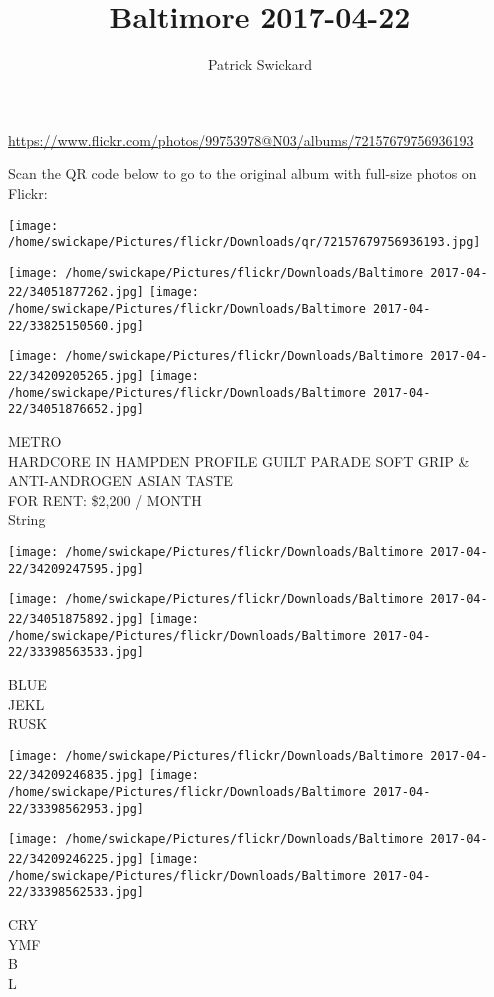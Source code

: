 \documentclass[10pt,letterpaper]{article}
\title{Baltimore 2017-04-22}
\author{Patrick Swickard}
\date{}
\begin{document}
\maketitle

\url{https://www.flickr.com/photos/99753978@N03/albums/72157679756936193}

Scan the QR code below to go to the original album with full-size photos on Flickr:

\texttt{[image: /home/swickape/Pictures/flickr/Downloads/qr/72157679756936193.jpg]}
\pagebreak

\texttt{[image: /home/swickape/Pictures/flickr/Downloads/Baltimore 2017-04-22/34051877262.jpg]}
\texttt{[image: /home/swickape/Pictures/flickr/Downloads/Baltimore 2017-04-22/33825150560.jpg]}

\texttt{[image: /home/swickape/Pictures/flickr/Downloads/Baltimore 2017-04-22/34209205265.jpg]}
\texttt{[image: /home/swickape/Pictures/flickr/Downloads/Baltimore 2017-04-22/34051876652.jpg]}

METRO\\
HARDCORE IN HAMPDEN PROFILE GUILT PARADE SOFT GRIP \& ANTI{-}ANDROGEN ASIAN TASTE\\
FOR RENT: \$2,200 / MONTH\\
String
\pagebreak

\texttt{[image: /home/swickape/Pictures/flickr/Downloads/Baltimore 2017-04-22/34209247595.jpg]}

\vspace{0.25in}
\texttt{[image: /home/swickape/Pictures/flickr/Downloads/Baltimore 2017-04-22/34051875892.jpg]}
\texttt{[image: /home/swickape/Pictures/flickr/Downloads/Baltimore 2017-04-22/33398563533.jpg]}

BLUE\\
JEKL\\
RUSK
\pagebreak

\texttt{[image: /home/swickape/Pictures/flickr/Downloads/Baltimore 2017-04-22/34209246835.jpg]}
\texttt{[image: /home/swickape/Pictures/flickr/Downloads/Baltimore 2017-04-22/33398562953.jpg]}

\texttt{[image: /home/swickape/Pictures/flickr/Downloads/Baltimore 2017-04-22/34209246225.jpg]}
\texttt{[image: /home/swickape/Pictures/flickr/Downloads/Baltimore 2017-04-22/33398562533.jpg]}

CRY\\
YMF\\
B\\
L
\pagebreak
\end{document}
